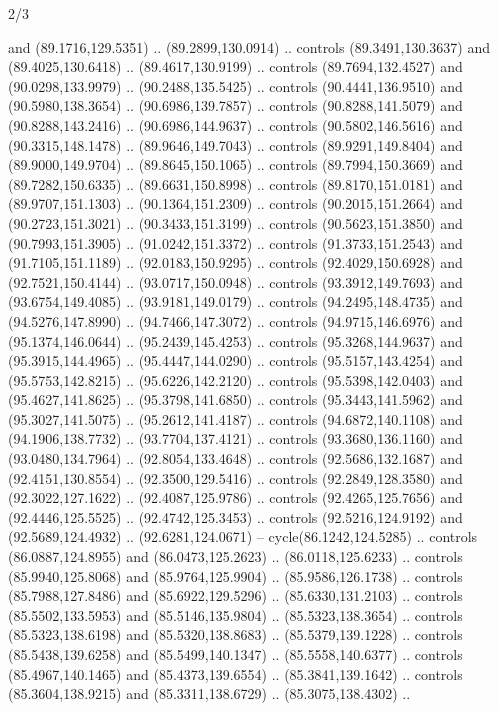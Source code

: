 \begin{flagdescription}{2/3}
\begin{scope}[shift={(0.5\flaglength,0.5)},scale=\flagwidth/320]
\begin{scope}[y=0.8pt, x=0.8pt, yscale=-1,shift={(-118.3,-146)}]
  and (89.1716,129.5351) .. (89.2899,130.0914) .. controls (89.3491,130.3637)
  and (89.4025,130.6418) .. (89.4617,130.9199) .. controls (89.7694,132.4527)
  and (90.0298,133.9979) .. (90.2488,135.5425) .. controls (90.4441,136.9510)
  and (90.5980,138.3654) .. (90.6986,139.7857) .. controls (90.8288,141.5079)
  and (90.8288,143.2416) .. (90.6986,144.9637) .. controls (90.5802,146.5616)
  and (90.3315,148.1478) .. (89.9646,149.7043) .. controls (89.9291,149.8404)
  and (89.9000,149.9704) .. (89.8645,150.1065) .. controls (89.7994,150.3669)
  and (89.7282,150.6335) .. (89.6631,150.8998) .. controls (89.8170,151.0181)
  and (89.9707,151.1303) .. (90.1364,151.2309) .. controls (90.2015,151.2664)
  and (90.2723,151.3021) .. (90.3433,151.3199) .. controls (90.5623,151.3850)
  and (90.7993,151.3905) .. (91.0242,151.3372) .. controls (91.3733,151.2543)
  and (91.7105,151.1189) .. (92.0183,150.9295) .. controls (92.4029,150.6928)
  and (92.7521,150.4144) .. (93.0717,150.0948) .. controls (93.3912,149.7693)
  and (93.6754,149.4085) .. (93.9181,149.0179) .. controls (94.2495,148.4735)
  and (94.5276,147.8990) .. (94.7466,147.3072) .. controls (94.9715,146.6976)
  and (95.1374,146.0644) .. (95.2439,145.4253) .. controls (95.3268,144.9637)
  and (95.3915,144.4965) .. (95.4447,144.0290) .. controls (95.5157,143.4254)
  and (95.5753,142.8215) .. (95.6226,142.2120) .. controls (95.5398,142.0403)
  and (95.4627,141.8625) .. (95.3798,141.6850) .. controls (95.3443,141.5962)
  and (95.3027,141.5075) .. (95.2612,141.4187) .. controls (94.6872,140.1108)
  and (94.1906,138.7732) .. (93.7704,137.4121) .. controls (93.3680,136.1160)
  and (93.0480,134.7964) .. (92.8054,133.4648) .. controls (92.5686,132.1687)
  and (92.4151,130.8554) .. (92.3500,129.5416) .. controls (92.2849,128.3580)
  and (92.3022,127.1622) .. (92.4087,125.9786) .. controls (92.4265,125.7656)
  and (92.4446,125.5525) .. (92.4742,125.3453) .. controls (92.5216,124.9192)
  and (92.5689,124.4932) .. (92.6281,124.0671) -- cycle(86.1242,124.5285) ..
  controls (86.0887,124.8955) and (86.0473,125.2623) .. (86.0118,125.6233) ..
  controls (85.9940,125.8068) and (85.9764,125.9904) .. (85.9586,126.1738) ..
  controls (85.7988,127.8486) and (85.6922,129.5296) .. (85.6330,131.2103) ..
  controls (85.5502,133.5953) and (85.5146,135.9804) .. (85.5323,138.3654) ..
  controls (85.5323,138.6198) and (85.5320,138.8683) .. (85.5379,139.1228) ..
  controls (85.5438,139.6258) and (85.5499,140.1347) .. (85.5558,140.6377) ..
  controls (85.4967,140.1465) and (85.4373,139.6554) .. (85.3841,139.1642) ..
  controls (85.3604,138.9215) and (85.3311,138.6729) .. (85.3075,138.4302) ..

\end{scope}
\end{scope}
\end{flagdescription}
